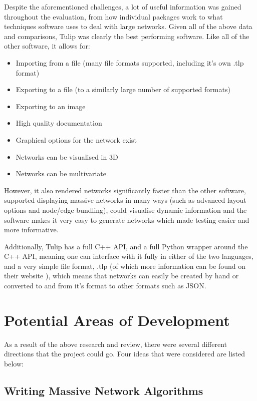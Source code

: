 \documentclass[../dissertation.tex]{subfiles}
\begin{document}
Despite the aforementioned challenges, a lot of useful information was gained throughout the evaluation, from how individual packages work to what techniques software uses to deal with large networks. Given all of the above data and comparisons, Tulip was clearly the best performing software. Like all of the other software, it allows for:
\begin{itemize}
    \item Importing from a file (many file formats supported, including it's own .tlp format)
    \item Exporting to a file (to a similarly large number of supported formats)
    \item Exporting to an image
    \item High quality documentation
    \item Graphical options for the network exist
    \item Networks can be visualised in 3D
    \item Networks can be multivariate
\end{itemize}

However, it also rendered networks significantly faster than the other software, supported displaying massive networks in many ways (such as advanced layout options and node/edge bundling), could visualise dynamic information and the software makes it very easy to generate networks which made testing easier and more informative. 

Additionally, Tulip has a full C++ API, and a full Python wrapper around the C++ API, meaning one can interface with it fully in either of the two languages, and a very simple file format, .tlp (of which more information can be found on their website \cite{tuliptlp}), which means that networks can easily be created by hand or converted to and from it's format to other formats such as JSON.

\section{Potential Areas of Development}

As a result of the above research and review, there were several different directions that the project could go. Four ideas that were considered are listed below:

\subsection{Writing Massive Network Algorithms}
\end{document}
